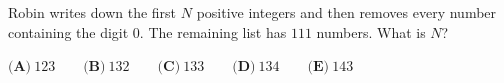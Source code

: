 Robin writes down the first $N$ positive integers and then removes every number containing the digit $0$. The remaining list has $111$ numbers. What is $N$?

$\textbf{(A)}\ 123\qquad\textbf{(B)}\ 132\qquad\textbf{(C)}\ 133\qquad\textbf{(D)}\ 134\qquad\textbf{(E)}\ 143$
